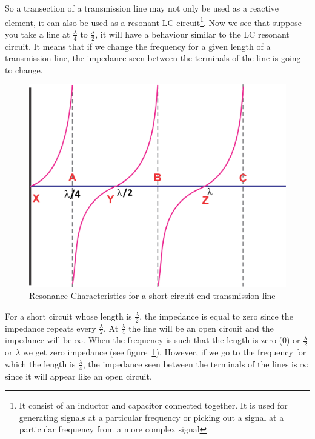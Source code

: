 So a transection of a transmission line may not only be used as a reactive element, it can also be used as a resonant LC circuit\footnote{
It consist of an inductor and capacitor connected together. It is used for generating signals at a particular frequency or picking out a signal at a particular frequency from a more complex signal
}. Now we see that suppose you take a line at $ \frac{\lambda}{4} $ to $ \frac{\lambda}{2} $, it will have a behaviour similar to the LC resonant circuit. It means that if we change the frequency for a given length of a transmission line, the impedance seen between the terminals of the line is going to change.
\begin{figure}[h]
\centering
\includegraphics[width=0.7\linewidth]{./graphics/group10diagram10}
\caption{Resonance Characteristics for a short circuit end transmission line}
\label{fig:group10diagram11}
\end{figure}

For a short circuit whose length is $ \frac{\lambda}{2} $, the impedance is equal to zero since the impedance repeats every $\frac{\lambda}{2}$. At $ \frac{\lambda}{4} $ the line will be an open circuit and the impedance will be $\infty$. When the frequency is such that the length is zero (0) or $ \frac{\lambda}{2} $ or $ \lambda $ we get zero impedance (see figure~\ref{fig:group10diagram11}). However, if we go to the frequency for which the length is $ \frac{\lambda}{4} $, the impedance seen between the terminals of the lines is $\infty$ since it will appear like an open circuit.


